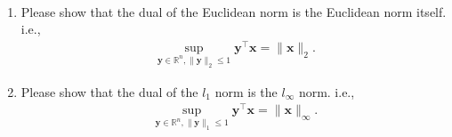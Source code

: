 \documentclass[11pt,letter,notitlepage]{article}
\theoremstyle{definition}
\begin{document}
\begin{exercise}[Norms]
\begin{enumerate}
\begin{align*}
		\end{align*}
		\begin{enumerate}
			\item Please show that the dual of the Euclidean norm is the Euclidean norm itself. i.e., 
			\begin{align*}
				\sup_{\mathbf{y}\in \mathbb{R}^n, \|\mathbf{y}\|_2\le 1}\mathbf{y}^{\top}\mathbf{x} = \|\mathbf{x}\|_2.
			\end{align*}
			\item Please show that the dual of the $l_1$ norm is the $l_{\infty}$ norm. i.e.,
			\begin{align*}
				\sup_{\mathbf{y}\in \mathbb{R}^n, \|\mathbf{y}\|_1\le 1}\mathbf{y}^{\top}\mathbf{x} = \|\mathbf{x}\|_{\infty}.
			\end{align*}
		\end{enumerate}
    \end{enumerate}
\end{exercise}

\newpage
\end{document}
